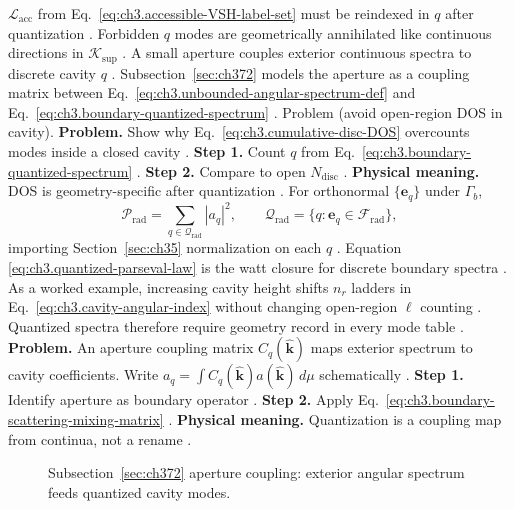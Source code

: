 \(\mathcal{L}_{\mathrm{acc}}\) from Eq.~\eqref{eq:ch3.accessible-VSH-label-set} must be reindexed in \(q\) after
quantization \cite{harrington2001}. Forbidden \(q\) modes are geometrically annihilated like continuous
directions in \(\mathcal{K}_{\mathrm{sup}}\) \cite{stratton1941}.
A small aperture couples exterior continuous spectra to discrete cavity \(q\) \cite{harrington2001}.
Subsection~\ref{sec:ch372} models the aperture as a coupling matrix between Eq.~\eqref{eq:ch3.unbounded-angular-spectrum-def}
and Eq.~\eqref{eq:ch3.boundary-quantized-spectrum} \cite{hansen1988}.
Problem (avoid open-region DOS in cavity). \textbf{Problem.} Show why Eq.~\eqref{eq:ch3.cumulative-disc-DOS} overcounts modes inside a closed cavity
\cite{harrington2001}.
\textbf{Step 1.} Count \(q\) from Eq.~\eqref{eq:ch3.boundary-quantized-spectrum} \cite{jackson1999}.
\textbf{Step 2.} Compare to open \(N_{\mathrm{disc}}\) \cite{hansen1988}.
\textbf{Physical meaning.} DOS is geometry-specific after quantization \cite{harrington2001}.
For orthonormal \(\{\mathbf{e}_{q}\}\) under \(\Gamma_{b}\),
\begin{equation}
\label{eq:ch3.quantized-parseval-law}
\mathcal{P}_{\mathrm{rad}}
=
\sum_{q\in\mathcal{Q}_{\mathrm{rad}}}
|a_{q}|^{2},
\qquad
\mathcal{Q}_{\mathrm{rad}}=\{q:\mathbf{e}_{q}\in\mathcal{F}_{\mathrm{rad}}\},
\end{equation}
importing Section~\ref{sec:ch35} normalization on each \(q\) \cite{poynting1884}. Equation
\eqref{eq:ch3.quantized-parseval-law} is the watt closure for discrete boundary spectra \cite{hansen1988}.
As a worked example, increasing cavity height shifts \(n_{r}\) ladders in Eq.~\eqref{eq:ch3.cavity-angular-index} without changing open-region
\(\ell\) counting \cite{jackson1999}. Quantized spectra therefore require geometry record in every mode table
\cite{harrington2001}.
\textbf{Problem.} An aperture coupling matrix \(C_{q}(\widehat{\mathbf{k}})\) maps exterior spectrum to cavity coefficients. Write
\(a_{q}=\int C_{q}(\widehat{\mathbf{k}})a(\widehat{\mathbf{k}})\,d\mu\) schematically \cite{harrington2001}.
\textbf{Step 1.} Identify aperture as boundary operator \cite{stratton1941}.
\textbf{Step 2.} Apply Eq.~\eqref{eq:ch3.boundary-scattering-mixing-matrix} \cite{hansen1988}.
\textbf{Physical meaning.} Quantization is a coupling map from continua, not a rename \cite{harrington2001}.
\begin{figure}[t]
\centering
{}
\caption{Subsection~\ref{sec:ch372} aperture coupling: exterior angular spectrum feeds quantized cavity modes.}
\label{fig:ch3.372-aperture-coupling}
\end{figure}
